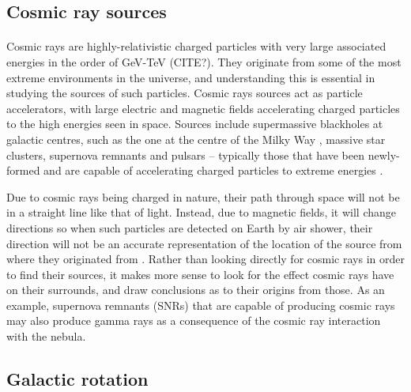 \documentclass[a4paper, titlepage, oneside]{article}
\begin{document}
\begin{multicols}{2}
\subsection{Cosmic ray sources}
\paragraph{}
Cosmic rays are highly-relativistic charged particles with very large associated energies in the order of GeV-TeV (CITE?). They originate from some of the most extreme environments in the universe, and understanding this is essential in studying the sources of such particles. Cosmic rays sources act as particle accelerators, with large electric and magnetic fields accelerating charged particles to the high energies seen in space. Sources include supermassive blackholes at galactic centres, such as the one at the centre of the Milky Way \parencite{Guo:2013}, massive star clusters, supernova remnants \parencite{Vink:2013} and pulsars -- typically those that have been newly-formed and are capable of accelerating charged particles to extreme energies \parencite{Fang:2012}.

Due to cosmic rays being charged in nature, their path through space will not be in a straight line like that of light. Instead, due to magnetic fields, it will change directions so when such particles are detected on Earth by air shower, their direction will not be an accurate representation of the location of the source from where they originated from \parencite{Kalli:2011}. Rather than looking directly for cosmic rays in order to find their sources, it makes more sense to look for the effect cosmic rays have on their surrounds, and draw conclusions as to their origins from those. As an example, supernova remnants (SNRs) that are capable of producing cosmic rays may also produce gamma rays as a consequence of the cosmic ray interaction with the nebula.

\subsection{Galactic rotation}
\label{sec:gal-rot}

\end{multicols}
\end{document}
